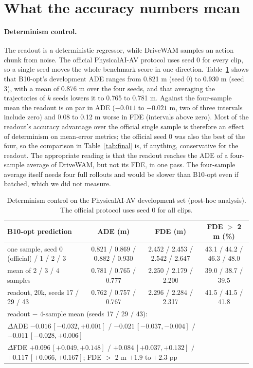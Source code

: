 \documentclass[10pt]{article}
\begin{document}
\section{What the accuracy numbers mean}
\label{sec:meaning}

\paragraph{Determinism control.} The readout is a deterministic regressor, while DriveWAM samples an action chunk from noise. The official PhysicalAI-AV protocol uses seed 0 for every clip, so a single seed moves the whole benchmark score in one direction. Table~\ref{tab:determinism} shows that B10-opt's development ADE ranges from 0.821 m (seed 0) to 0.930 m (seed 3), with a mean of 0.876 m over the four seeds, and that averaging the trajectories of $k$ seeds lowers it to 0.765 to 0.781 m. Against the four-sample mean the readout is on par in ADE ($-0.011$ to $-0.021$ m, two of three intervals include zero) and 0.08 to 0.12 m worse in FDE (intervals above zero). Most of the readout's accuracy advantage over the official single sample is therefore an effect of determinism on mean-error metrics; the official seed 0 was also the best of the four, so the comparison in Table~\ref{tab:final} is, if anything, conservative for the readout. The appropriate reading is that the readout reaches the ADE of a four-sample average of DriveWAM, but not its FDE, in one pass. The four-sample average itself needs four full rollouts and would be slower than B10-opt even if batched, which we did not measure.

\begin{table}[t]
\caption{Determinism control on the PhysicalAI-AV development set (post-hoc analysis). The official protocol uses seed 0 for all clips.}
\label{tab:determinism}
\begin{center}
\footnotesize
\setlength{\tabcolsep}{2pt}
\begin{tabular}{lccc}
\toprule
B10-opt prediction & ADE (m) & FDE (m) & FDE $>$ 2 m (\%) \\
\midrule
one sample, seed 0 (official) / 1 / 2 / 3 & 0.821 / 0.869 / 0.882 / 0.930 & 2.452 / 2.453 / 2.542 / 2.647 & 43.1 / 44.2 / 46.3 / 48.0 \\
mean of 2 / 3 / 4 samples & 0.781 / 0.765 / 0.777 & 2.250 / 2.179 / 2.200 & 39.0 / 38.7 / 39.5 \\
\midrule
readout, 20k, seeds 17 / 29 / 43 & 0.762 / 0.757 / 0.767 & 2.296 / 2.284 / 2.317 & 41.5 / 41.5 / 41.8 \\
\multicolumn{4}{l}{readout $-$ 4-sample mean (seeds 17 / 29 / 43):} \\
\multicolumn{4}{l}{\quad $\Delta$ADE $-0.016\,[-0.032,+0.001]$ / $-0.021\,[-0.037,-0.004]$ / $-0.011\,[-0.028,+0.006]$} \\
\multicolumn{4}{l}{\quad $\Delta$FDE $+0.096\,[+0.049,+0.148]$ / $+0.084\,[+0.037,+0.132]$ / $+0.117\,[+0.066,+0.167]$; FDE $>$ 2 m $+1.9$ to $+2.3$ pp} \\
\bottomrule
\end{tabular}
\end{center}
\end{table}
\end{document}
